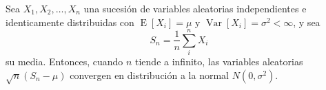 \documentclass{article}
\begin{document}
Sea $X_1, X_2, \ldots, X_n$ una sucesión de variables 
aleatorias independientes e
identicamente distribuidas con
$\operatorname{E}[X_i] = \mu$ y
$\operatorname{Var}[X_i] = \sigma^2 < \infty$, y sea
\begin{equation*}
S_n = \frac{1}{n}\sum_{i}^{n} X_i
\end{equation*}
su media. Entonces, cuando  $n$ tiende a infinito, 
las variables aleatorias $\sqrt{n}(S_n - \mu)$ convergen en
distribución a la normal $N(0, \sigma^2)$.

\end{document}
